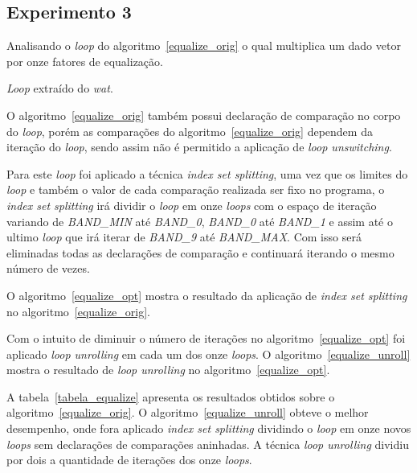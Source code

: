 \subsection{Experimento 3}

Analisando o \textit{loop} do algoritmo~\ref{equalize_orig} o qual multiplica um dado 
vetor por onze fatores de equalização.

\begin{algorithm}[H]
  \caption{\textit{Loop} extraído do \textit{wat}.}
\label{equalize_orig}

\end{algorithm}

O algoritmo~\ref{equalize_orig} também possui declaração de comparação no corpo do
\textit{loop}, porém as comparações do algoritmo~\ref{equalize_orig} dependem da
iteração do \textit{loop}, sendo assim não é permitido a aplicação de
\textit{loop unswitching}.

Para este \textit{loop} foi aplicado a técnica \textit{index set
splitting}, uma vez que os limites do \textit{loop} e também o valor de cada
comparação realizada ser fixo no programa, o \textit{index set splitting} irá
dividir o \textit{loop} em onze \textit{loops} com o espaço de iteração variando
de \textit{BAND\_MIN} até \textit{BAND\_0}, \textit{BAND\_0} até \textit{BAND\_1} e
assim até o ultimo \textit{loop} que irá iterar de \textit{BAND\_9} até
\textit{BAND\_MAX}. Com isso será eliminadas todas as declarações de comparação e
continuará iterando o mesmo número de vezes.

O algoritmo~\ref{equalize_opt} mostra o resultado da aplicação de 
\textit{index set splitting} no algoritmo~\ref{equalize_orig}.

Com o intuito de diminuir o número de iterações no algoritmo~\ref{equalize_opt}
foi aplicado \textit{loop unrolling} em cada um dos onze \textit{loops}. 
O algoritmo~\ref{equalize_unroll} mostra o resultado de \textit{loop unrolling}
no algoritmo~\ref{equalize_opt}.

A tabela~\ref{tabela_equalize} apresenta os resultados obtidos sobre o
algoritmo~\ref{equalize_orig}. O algoritmo~\ref{equalize_unroll} obteve o melhor
desempenho, onde fora aplicado \textit{index set splitting} dividindo o
\textit{loop} em onze novos \textit{loops} sem declarações de comparações
aninhadas. A técnica \textit{loop unrolling} dividiu por dois a quantidade de
iterações dos onze \textit{loops}.

